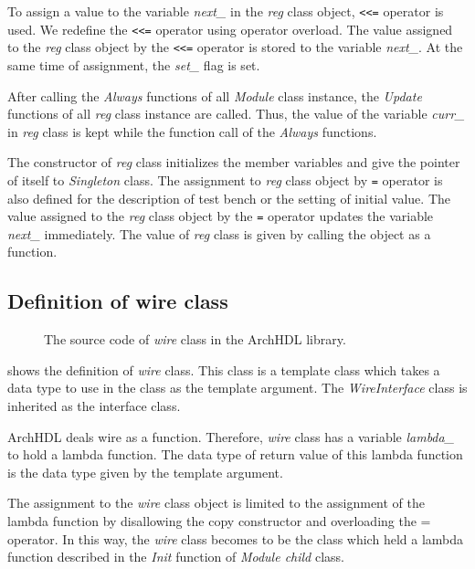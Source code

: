 To assign a value to the variable \textit{next\_} in the \textit{reg} class object, \verb`<<=` operator is used.
We redefine the \verb`<<=` operator using operator overload.
The value assigned to the \textit{reg} class object by the \verb`<<=` operator is stored to the variable \textit{next\_}.
At the same time of assignment, the \textit{set\_} flag is set.

After calling the \textit{Always} functions of all \textit{Module} class instance, the \textit{Update} functions of all \textit{reg} class instance are called.
Thus, the value of the variable \textit{curr\_} in \textit{reg} class is kept while the function call of the \textit{Always} functions.

The constructor of \textit{reg} class initializes the member variables and give the pointer of itself to \textit{Singleton} class.
The assignment to \textit{reg} class object by \verb`=` operator is also defined for the description of test bench or the setting of initial value.
The value assigned to the \textit{reg} class object by the \verb`=` operator updates the variable \textit{next\_} immediately.
The value of \textit{reg} class is given by calling the object as a function.

\subsection{Definition of wire class}

\begin{figure}[t]
 
 \caption{The source code of \textit{wire} class in the ArchHDL library.}
 \label{src:wire}
\end{figure}

 shows the definition of \textit{wire} class.
This class is a template class which takes a data type to use in the class as the template argument.
The \textit{WireInterface} class is inherited as the interface class.

ArchHDL deals wire as a function.
Therefore, \textit{wire} class has a variable \textit{lambda\_} to hold a lambda function.
The data type of return value of this lambda function is the data type given by the template argument.

The assignment to the \textit{wire} class object is limited to the assignment of the lambda function by disallowing the copy constructor and overloading the = operator.
In this way, the \textit{wire} class becomes to be the class which held a lambda function described in the \textit{Init} function of \textit{Module child} class.

